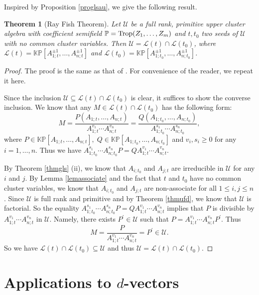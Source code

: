 \documentclass{amsart}
\newtheorem{theorem}{Theorem}[section]
\theoremstyle{definition}
\theoremstyle{remark}
\numberwithin{equation}{section}
\begin{document}
Inspired by Proposition \ref{proglsau}, we give the following result.
\begin{theorem}[Ray Fish Theorem]\label{thmstrong}
Let $\mathcal U$ be a full rank, primitive upper cluster algebra with coefficient semifield $\mathbb P={\rm Trop}(Z_1,\ldots,Z_m)$ and $t, t_0$ two seeds of $\mathcal U$ with no common cluster variables. Then $\mathcal U=\mathcal L(t)\cap\mathcal L(t_0)$, where $\mathcal L(t)=\mathbb {KP}[A_{1;t}^{\pm1},\ldots,A_{n;t}^{\pm1}]$ and $\mathcal L(t_0)=\mathbb {KP}[A_{1;t_0}^{\pm1},\ldots,A_{n;t_0}^{\pm1}]$.
\end{theorem}

\begin{proof}The proof is the same as that of \cite[Corollary 4.2]{GLS13}. For convenience of the reader, we repeat it here.


Since the inclusion $\mathcal U\subseteq \mathcal L(t)\cap\mathcal L(t_0)$ is clear, it suffices to show the converse inclusion.
We know that
any $M\in \mathcal L(t)\cap\mathcal L(t_0)$ has the following form:
$$M=\frac{P(A_{1;t},\ldots,A_{n;t})}{A_{1;t}^{v_1}\cdots A_{n;t}^{v_n}}=\frac{Q(A_{1;t_0},\ldots,A_{n;t_0})}{A_{1;t_0}^{s_1}\cdots A_{n;t_0}^{s_n}},$$
where $P\in\mathbb{KP}[A_{1;t},\ldots,A_{n;t}],\; Q\in\mathbb{KP}[A_{1;t_0},\ldots,A_{n;t_0}]$ and $v_i,s_i\geq0$ for any $i=1,\ldots,n$. Thus we have $A_{1;t_0}^{s_1}\cdots A_{n;t_0}^{s_n}P=QA_{1;t}^{v_1}\cdots A_{n;t}^{v_n}.$

By Theorem \ref{thmgls} (ii), we know that $A_{i;t_0}$ and $A_{j;t}$ are irreducible in $\mathcal U$ for any $i$ and $j$. By Lemma \ref{lemassociate} and the fact that $t$ and $t_0$ have no common cluster variables, we know that $A_{i;t_0}$ and $A_{j;t}$ are non-associate for all $1\leq i,j\leq n$. Since $\mathcal U$ is full rank and primitive and by Theorem \ref{thmufd}, we know that $\mathcal U$ is factorial. So the equality $A_{1;t_0}^{s_1}\cdots A_{n;t_0}^{s_n}P=QA_{1;t}^{v_1}\cdots A_{n;t}^{v_n}$ implies that $P$ is divisible by $A_{1;t}^{v_1}\cdots A_{n;t}^{v_n}$ in $\mathcal U$. Namely, there exists $P^\prime\in\mathcal U$ such that $P= A_{1;t}^{v_1}\cdots A_{n;t}^{v_n}P^\prime$. Thus $$M=\frac{P}{A_{1;t}^{v_1}\cdots A_{n;t}^{v_n}}=P^\prime\in\mathcal U.$$
So we have $\mathcal L(t)\cap\mathcal L(t_0)\subseteq\mathcal U$ and thus $\mathcal U=\mathcal L(t)\cap\mathcal L(t_0)$.
\end{proof}





\section{Applications to \texorpdfstring{$d$}{Lg}-vectors}\label{sec5}
\end{document}
